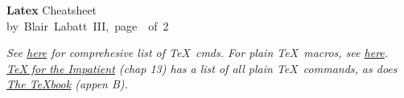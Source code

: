 \documentclass[10pt,landscape]{article}
\newcommand{\header}{
\begin{mdframed}[]
\footnotesize
\sffamily
\Large{\textbf{Latex}} \footnotesize Cheatsheet\\
by~Blair~Labatt~III,~page~\thepage~of~2
\end{mdframed}
}
\begin{document}
\small
\begin{multicols*}{4}
\header
\textsl{See \href{https://www.tug.org/utilities/plain/cseq.html}{here} for comprehesive list of  \TeX\ cmds. For plain \TeX\ macros, see \href{https://www.tutorialspoint.com/tex_commands/}{here}. \href{http://mirrors.ctan.org/info/impatient/book.pdf}{\ul{TeX for the Impatient}} (chap 13) has a list of all plain \TeX\ commands, as does \href{https://ctan.org/pkg/texbook}{\ul{The \TeX book}} (appen B).}\\




%


%
%
%



\vfill\,

\end{multicols*}
\end{document}
